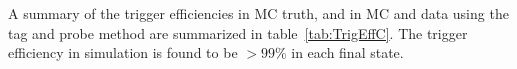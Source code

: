 A summary of the trigger efficiencies in MC truth, and in MC and data using the tag and probe method are summarized in table~\ref{tab:TrigEffC}. The trigger efficiency in simulation is found to be $>99\%$ in each final state.




